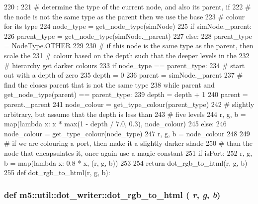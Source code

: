 \begin{DoxyCode}
220                                            :
221     # determine the type of the current node, and also its parent, if
222     # the node is not the same type as the parent then we use the base
223     # colour for its type
224     node_type = get_node_type(simNode)
225     if simNode._parent:
226         parent_type = get_node_type(simNode._parent)
227     else:
228         parent_type = NodeType.OTHER
229 
230     # if this node is the same type as the parent, then scale the
231     # colour based on the depth such that the deeper levels in the
232     # hierarchy get darker colours
233     if node_type == parent_type:
234         # start out with a depth of zero
235         depth = 0
236         parent = simNode._parent
237         # find the closes parent that is not the same type
238         while parent and get_node_type(parent) == parent_type:
239             depth = depth + 1
240             parent = parent._parent
241         node_colour = get_type_colour(parent_type)
242         # slightly arbitrary, but assume that the depth is less than
243         # five levels
244         r, g, b = map(lambda x: x * max(1 - depth / 7.0, 0.3), node_colour)
245     else:
246         node_colour = get_type_colour(node_type)
247         r, g, b = node_colour
248 
249     # if we are colouring a port, then make it a slightly darker shade
250     # than the node that encapsulates it, once again use a magic constant
251     if isPort:
252         r, g, b = map(lambda x: 0.8 * x, (r, g, b))
253 
254     return dot_rgb_to_html(r, g, b)
255 
def dot_rgb_to_html(r, g, b):
\end{DoxyCode}
\hypertarget{namespacem5_1_1util_1_1dot__writer_a7583ad2189f2e3cdd087d9d5e62ce1af}{
\subsubsection[{dot\_\-rgb\_\-to\_\-html}]{\setlength{\rightskip}{0pt plus 5cm}def m5::util::dot\_\-writer::dot\_\-rgb\_\-to\_\-html ( {\em r}, \/   {\em g}, \/   {\em b})}}
\label{namespacem5_1_1util_1_1dot__writer_a7583ad2189f2e3cdd087d9d5e62ce1af}



